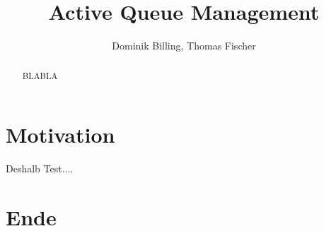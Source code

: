 \documentclass[10pt,article]{IEEEtran}
\title{Active Queue Management}
\author{Dominik Billing, Thomas Fischer}
\begin{document}
\maketitle

\begin{abstract}
BLABLA
\end{abstract}

\section{Motivation}
\cite{Appenzeller2004} Deshalb Test....
\section{Ende}


\end{document}
